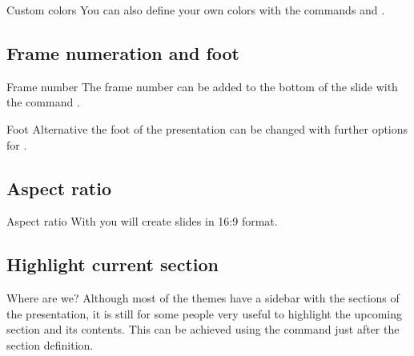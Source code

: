 \documentclass{beamer}
\begin{document}
\begin{frame}{Custom colors}
You can also define your own colors with the commands  and .
\end{frame}



\subsection[Frame numbers]{Frame numeration and foot}

\begin{frame}{Frame number}
The frame number can be added to the bottom of the slide with the command .
\end{frame}


\begin{frame}{Foot}
Alternative the foot of the presentation can be changed with further options for .
\end{frame}


\subsection[Aspect]{Aspect ratio}

\begin{frame}{Aspect ratio}
With  you will create slides in 16:9 format.
\end{frame}



\subsection{Highlight current section}
\begin{frame}{Where are we?}
Although most of the themes have a sidebar with the sections of the presentation, it is still for some people very useful to highlight the upcoming section and its contents. \pause
This can be achieved using the command  just after the section definition.
\end{frame}
\end{document}
